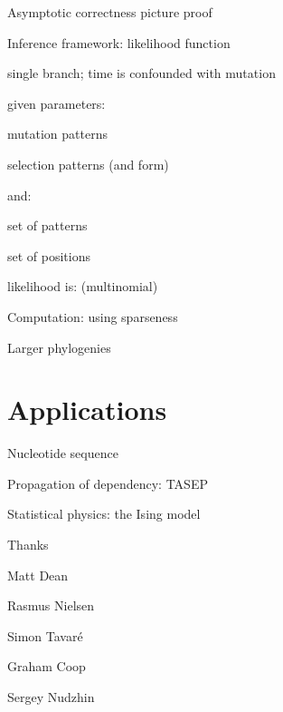 \documentclass[smaller]{beamer}
\begin{document}


\begin{frame}{Asymptotic correctness}
  picture proof
\end{frame}

\begin{frame}{Inference framework: likelihood function}

  single branch; time is confounded with mutation

  given parameters:
    
    mutation patterns

    selection patterns (and form)


  and:

    set of patterns

    set of positions


  likelihood is: (multinomial)

\end{frame}

\begin{frame}{Computation: using sparseness}

\end{frame}

\begin{frame}{Larger phylogenies}

\end{frame}


\section{Applications}

\begin{frame}{Nucleotide sequence}

\end{frame}

\begin{frame}{Propagation of dependency: TASEP}

\end{frame}

\begin{frame}{Statistical physics: the Ising model}

\end{frame}




\begin{frame}{Thanks}

  Matt Dean
  
  Rasmus Nielsen

  Simon Tavar\'e

  Graham Coop

  Sergey Nudzhin

\end{frame}
\end{document}
